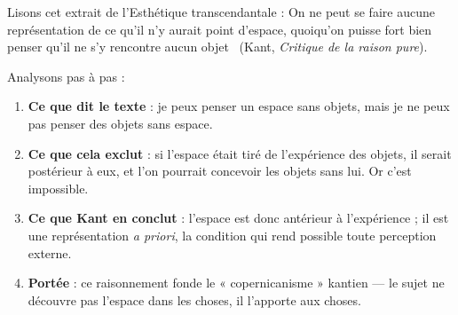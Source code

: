 \documentclass[11pt]{article}
\begin{document}
\begin{experience}
Lisons cet extrait de l'\guillemotleft Esthétique transcendantale \guillemotright : \guillemotleft On ne peut se faire aucune représentation de ce qu'il n'y aurait point d'espace, quoiqu'on puisse fort bien penser qu'il ne s'y rencontre aucun objet \guillemotright\ (Kant, \emph{Critique de la raison pure}).

Analysons pas à pas :
\begin{enumerate}
\item \textbf{Ce que dit le texte} : je peux penser un espace sans objets, mais je ne peux pas penser des objets sans espace.
\item \textbf{Ce que cela exclut} : si l'espace était tiré de l'expérience des objets, il serait postérieur à eux, et l'on pourrait concevoir les objets sans lui. Or c'est impossible.
\item \textbf{Ce que Kant en conclut} : l'espace est donc antérieur à l'expérience ; il est une représentation \emph{a priori}, la condition qui rend possible toute perception externe.
\item \textbf{Portée} : ce raisonnement fonde le « copernicanisme » kantien — le sujet ne découvre pas l'espace dans les choses, il l'apporte aux choses.
\end{enumerate}
\end{experience}
\end{document}
